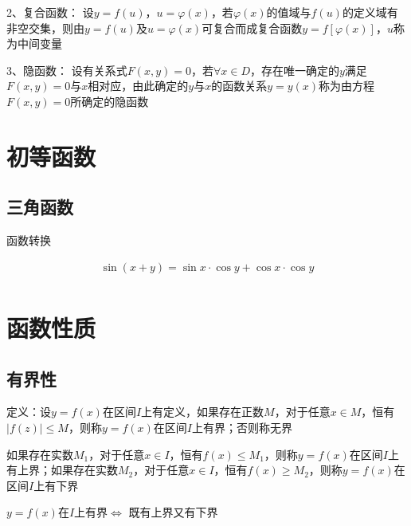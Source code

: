 \documentclass[12pt]{book}
\begin{document}
2、复合函数：
设$ y = f(u)$，$u=\varphi(x)$，若$\varphi(x)$的值域与$f(u)$的定义域有非空交集，则由$ y = f(u)$及$u=\varphi(x)$可复合而成复合函数$ y = f[\varphi(x)]$，$u$称为中间变量

3、隐函数：
设有关系式$ F(x,y)=0$，若$\forall x\in D$，存在唯一确定的$y$满足$F(x,y)= 0$与$x$相对应，由此确定的$y$与$ x $的函数关系$y = y(x)$称为由方程$  F(x,y)= 0  $所确定的隐函数



\section{初等函数}











\subsection{三角函数}

函数转换


\begin{align*}
\sin(x+y) = \sin{x}\cdot\cos{y}+\cos{x}\cdot\cos{y} \\

\end{align*}














\section{函数性质}


\subsection{有界性}

定义：设$y=f(x)$在区间$I$上有定义，如果存在正数$M$，对于任意$ x \in M$，恒有$|f(z)|\leq M$，则称$y=f(x)$在区间$I$上有界；否则称无界

如果存在实数$M_1$，对于任意$x\in I$，恒有$f(x)\leq M_1$，则称$y=f(x)$在区间$I$上有上界；如果存在实数$ M_2$，对于任意$x\in  I$，恒有$ f(x)\geq M_2$，则称$y=f(x)$在区间$I$上有下界

$y=f(x)$在$I$上有界$\Leftrightarrow$ 既有上界又有下界
\end{document}

